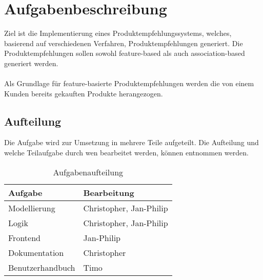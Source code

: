 \chapter{Aufgabenbeschreibung}
Ziel ist die Implementierung eines Produktempfehlungssystems, welches, basierend auf verschiedenen Verfahren, Produktempfehlungen generiert. Die Produktempfehlungen sollen sowohl feature-based als auch association-based generiert werden. \\
\\
Als Grundlage für feature-basierte Produktempfehlungen werden die von einem Kunden bereits gekauften Produkte herangezogen.

\section*{Aufteilung}
Die Aufgabe wird zur Umsetzung in mehrere Teile aufgeteilt. Die Aufteilung und welche Teilaufgabe durch wen bearbeitet werden, können  entnommen werden.

\begin{table}[H]
  \centering
  \begin{tabular}{|l|l|}
    \hline
    Aufgabe & Bearbeitung \\
    \hline
    \hline
    Modellierung & Christopher, Jan-Philip \\
    \hline
    Logik & Christopher, Jan-Philip \\
    \hline
    Frontend & Jan-Philip \\
    \hline
    Dokumentation & Christopher \\
    \hline
    Benutzerhandbuch & Timo \\
    \hline
  \end{tabular}
  \caption{Aufgabenaufteilung}
  \label{tbl:Aufgabenaufteilung}
\end{table}
